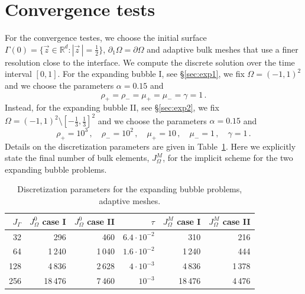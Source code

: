 \documentclass[a4paper,12pt,onecolumn]{article}
\newcommand{\R}{\mathbb R}
\begin{document}
\section{Convergence tests}\label{sec:ns_convergence_results}
For the convergence testes, we choose the initial surface $\Gamma(0) = \{ \vec
z \in \R^d : |\vec z\,| = \frac12 \}$, $\partial_1\Omega=\partial\Omega$ and
adaptive bulk meshes that use a finer resolution close to the interface. We
compute the discrete solution over the time interval $[0,1]$. For the expanding
bubble I, see \S\ref{sec:exp1}, we fix $\Omega = (-1,1)^2$ and we choose the
parameters $\alpha =0.15$ and
\begin{equation}
\rho_+ = \rho_- = \mu_+ = \mu_- = \gamma = 1\,.
\end{equation}
Instead, for the expanding bubble II, see \S\ref{sec:exp2}, we fix
$\Omega = (-1,1)^2 \setminus[-\frac13,\frac13]^2$ and we choose the parameters
$\alpha=0.15$ and
\begin{equation}
\rho_+ = 10^3\,,\quad \rho_- = 10^2\,,\quad \mu_+ = 10\,,\quad \mu_- = 1\,,\quad
\gamma = 1\,.
\end{equation}
Details on the discretization parameters are given in
Table~\ref{tab:nsexpandingbubbleelements}. Here we explicitly state the final
number of bulk elements, $J_\Omega^M$, for the implicit scheme for the two
expanding bubble problems.
\begin{table}
\center
\begin{tabular}{rrrrrr}
\hline
$J_\Gamma$ & $J_\Omega^0$ case I & $J_\Omega^0$ case II & $\tau$ &
$J_\Omega^M$ case I & $J_\Omega^M$ case II\\
\hline
 32 &   296 &  460 & $6.4\cdot10^{-2}$ &   310 &  216 \\
 64 &  1\,240 & 1\,040 & $1.6\cdot10^{-2}$ &  1\,240 &  444 \\
128 &  4\,836 & 2\,628 &   $4\cdot10^{-3}$ &  4\,836 & 1\,378 \\
256 & 18\,476 & 7\,460 &         $10^{-3}$ & 18\,476 & 4\,476 \\
\hline
\end{tabular}
\caption[Navier--Stokes expanding bubble meshes parameters]
{Discretization parameters for the expanding bubble problems, adaptive meshes.}
\label{tab:nsexpandingbubbleelements}
\end{table}
\end{document}
